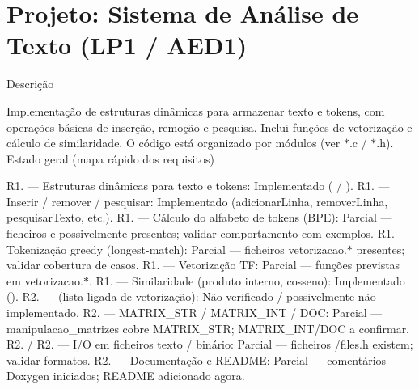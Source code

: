\chapter{Projeto\+: Sistema de Análise de Texto (LP1 / AED1) }
\hypertarget{md__r_e_a_d_m_e}{}\label{md__r_e_a_d_m_e}
\label{md__r_e_a_d_m_e_autotoc_md0}%
%


Descrição

Implementação de estruturas dinâmicas para armazenar texto e tokens, com operações básicas de inserção, remoção e pesquisa. Inclui funções de vetorização e cálculo de similaridade. O código está organizado por módulos (ver \texorpdfstring{$\ast$}{*}.c / \texorpdfstring{$\ast$}{*}.h). Estado geral (mapa rápido dos requisitos)

R1. — Estruturas dinâmicas para texto e tokens\+: Implementado ( / ). R1. — Inserir / remover / pesquisar\+: Implementado (adicionar\+Linha, remover\+Linha, pesquisar\+Texto, etc.). R1. — Cálculo do alfabeto de tokens (BPE)\+: Parcial — ficheiros  e possivelmente  presentes; validar comportamento com exemplos. R1. — Tokenização greedy (longest-\/match)\+: Parcial — ficheiros vetorizacao.\texorpdfstring{$\ast$}{*} presentes; validar cobertura de casos. R1. — Vetorização TF\+: Parcial — funções previstas em vetorizacao.\texorpdfstring{$\ast$}{*}. R1. — Similaridade (produto interno, cosseno)\+: Implementado (). R2. —  (lista ligada de vetorização)\+: Não verificado / possivelmente não implementado. R2. — MATRIX\+\_\+\+STR / MATRIX\+\_\+\+INT / DOC\+: Parcial — manipulacao\+\_\+matrizes cobre MATRIX\+\_\+\+STR; MATRIX\+\_\+\+INT/\+DOC a confirmar. R2. / R2. — I/O em ficheiros texto / binário\+: Parcial — ficheiros /files.h existem; validar formatos. R2. — Documentação e README\+: Parcial — comentários Doxygen iniciados; README adicionado agora. 